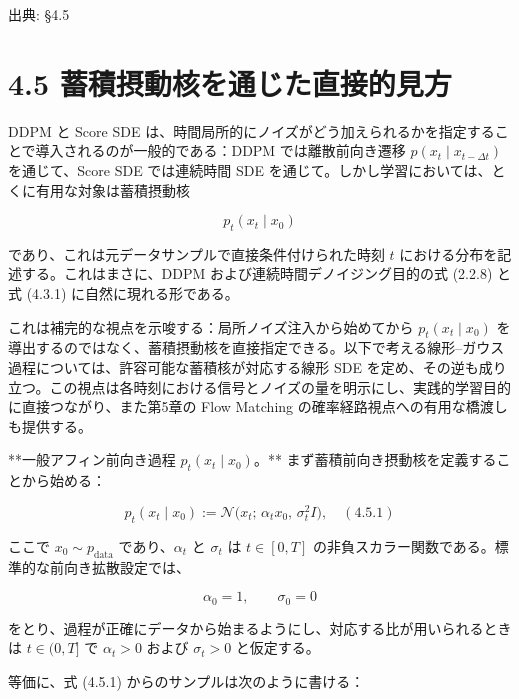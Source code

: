 

{\color{gray}\footnotesize 出典: §4.5\par}
\vspace{0.2em}

\section*{4.5 蓄積摂動核を通じた直接的見方}


DDPM と Score SDE は、時間局所的にノイズがどう加えられるかを指定することで導入されるのが一般的である：DDPM では離散前向き遷移 $p(x_t\mid x_{t-\Delta t})$ を通じて、Score SDE では連続時間 SDE を通じて。しかし学習においては、とくに有用な対象は蓄積摂動核

\[
p_t(x_t\mid x_0)
\]


であり、これは元データサンプルで直接条件付けられた時刻 $t$ における分布を記述する。これはまさに、DDPM および連続時間デノイジング目的の式 (2.2.8) と式 (4.3.1) に自然に現れる形である。

これは補完的な視点を示唆する：局所ノイズ注入から始めてから $p_t(x_t\mid x_0)$ を導出するのではなく、蓄積摂動核を直接指定できる。以下で考える線形–ガウス過程については、許容可能な蓄積核が対応する線形 SDE を定め、その逆も成り立つ。この視点は各時刻における信号とノイズの量を明示にし、実践的学習目的に直接つながり、また第5章の Flow Matching の確率経路視点への有用な橋渡しも提供する。



**一般アフィン前向き過程 $p_t(x_t\mid x_0)$。** まず蓄積前向き摂動核を定義することから始める：

\[
p_t(x_t\mid x_0):=\mathcal{N}\bigl(x_t;\, \alpha_t x_0,\, \sigma_t^2 I\bigr), \quad (4.5.1)
\]


ここで $x_0\sim p_{\mathrm{data}}$ であり、$\alpha_t$ と $\sigma_t$ は $t\in[0,T]$ の非負スカラー関数である。標準的な前向き拡散設定では、

\[
\alpha_0=1, \qquad \sigma_0=0
\]


をとり、過程が正確にデータから始まるようにし、対応する比が用いられるときは $t\in(0,T]$ で $\alpha_t>0$ および $\sigma_t>0$ と仮定する。

等価に、式 (4.5.1) からのサンプルは次のように書ける：

